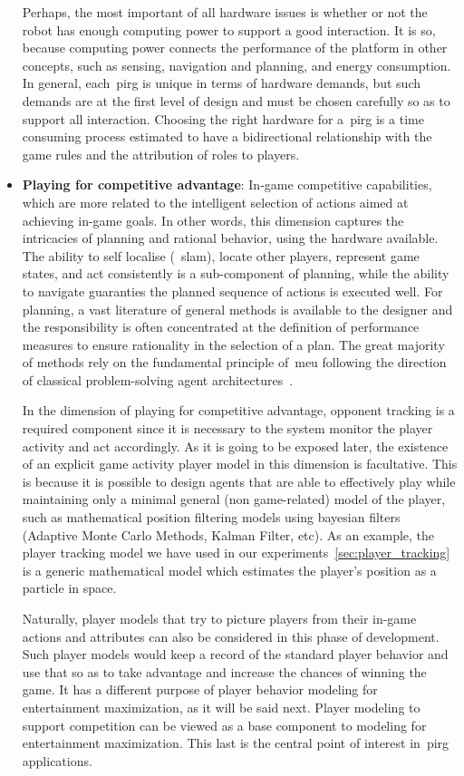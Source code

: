 \begin{itemize}[leftmargin=*,labelsep=5.8mm]
Perhaps, the most important of all hardware issues is whether or not the robot has enough computing power to support a good interaction. It is so, because computing power connects the performance of the platform in other concepts, such as sensing, navigation and planning, and energy consumption. In general, each~\gls{pirg} is unique in terms of hardware demands, but such demands are at the first level of design and must be chosen carefully so as to support all interaction. Choosing the right hardware for a~\gls{pirg} is a time consuming process estimated to have a bidirectional relationship with the game rules and the attribution of roles to players.

\item \textbf{Playing for competitive advantage}: In-game competitive capabilities, which are more related to the intelligent selection of actions aimed at achieving in-game goals. In other words, this dimension captures the intricacies of planning and rational behavior, using the hardware available. The ability to self localise (~\gls{slam}), locate other players, represent game states, and act consistently is a sub-component of planning, while the ability to navigate guaranties the planned sequence of actions is executed well. For planning, a vast literature of general methods is available to the designer and the responsibility is often concentrated at the definition of performance measures to ensure rationality in the selection of a plan. The great majority of methods rely on the fundamental principle of~\gls{meu} following the direction of classical problem-solving agent architectures~\citep{russell_artificial_2009}.

In the dimension of playing for competitive advantage, opponent tracking is a required component since it is necessary to the system monitor the player activity and act accordingly. As it is going to be exposed later, the existence of an explicit game activity player model in this dimension is facultative. This is because it is possible to design agents that are able to effectively play while maintaining only a minimal general (non game-related) model of the player, such as mathematical position filtering models using bayesian filters (\eg Adaptive Monte Carlo Methods, Kalman Filter, etc). As an example, the player tracking model we have used in our experiments~\ref{sec:player_tracking} is a generic mathematical model which estimates the player's position as a particle in space. 

Naturally, player models that try to picture players from their in-game actions and attributes can also be considered in this phase of development. Such player models would keep a record of the standard player behavior and use that so as to take advantage and increase the chances of winning the game. It has a different purpose of player behavior modeling for entertainment maximization, as it will be said next. Player modeling to support competition can be viewed as a base component to modeling for entertainment maximization. This last is the central point of interest in~\gls{pirg} applications.


\end{itemize}
